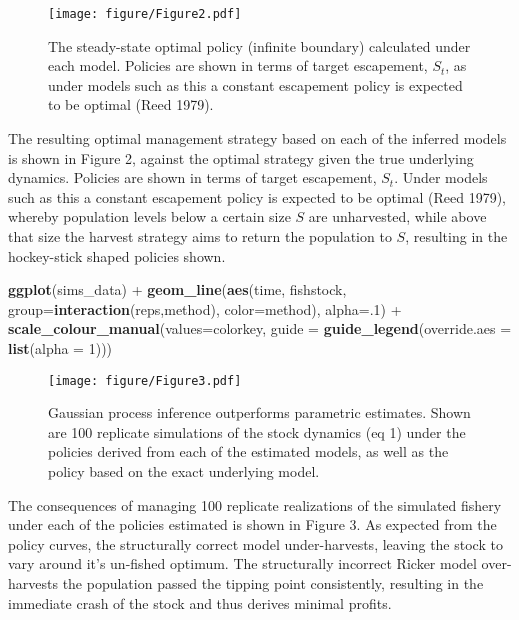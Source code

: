 \documentclass[author-year, review]{elsarticle} %
\makeatletter
\newenvironment{Shaded}{}{}
\newcommand{\KeywordTok}[1]{\textcolor[rgb]{0.00,0.44,0.13}{\textbf{{#1}}}}
\newcommand{\DataTypeTok}[1]{\textcolor[rgb]{0.56,0.13,0.00}{{#1}}}
\newcommand{\DecValTok}[1]{\textcolor[rgb]{0.25,0.63,0.44}{{#1}}}
\newcommand{\NormalTok}[1]{{#1}}
\def\maxwidth{\ifdim\Gin@nat@width>\linewidth\linewidth
\else\Gin@nat@width\fi}
\let\Oldincludegraphics\includegraphics
\renewcommand{\includegraphics}[1]{\Oldincludegraphics[width=\maxwidth]{#1}}
\makeatother
\begin{document}
\begin{figure}[htbp]
\centering
\texttt{[image: figure/Figure2.pdf]}
\caption{The steady-state optimal policy (infinite boundary) calculated
under each model. Policies are shown in terms of target escapement,
$S_t$, as under models such as this a constant escapement policy is
expected to be optimal (Reed 1979).}
\end{figure}

The resulting optimal management strategy based on each of the inferred
models is shown in Figure 2, against the optimal strategy given the true
underlying dynamics. Policies are shown in terms of target escapement,
$S_t$. Under models such as this a constant escapement policy is
expected to be optimal (Reed 1979), whereby population levels below a
certain size $S$ are unharvested, while above that size the harvest
strategy aims to return the population to $S$, resulting in the
hockey-stick shaped policies shown.

\begin{Shaded}
\begin{Highlighting}[]
\KeywordTok{ggplot}\NormalTok{(sims_data) + }
  \KeywordTok{geom_line}\NormalTok{(}\KeywordTok{aes}\NormalTok{(time, fishstock, }\DataTypeTok{group=}\KeywordTok{interaction}\NormalTok{(reps,method), }\DataTypeTok{color=}\NormalTok{method), }\DataTypeTok{alpha=}\NormalTok{.}\DecValTok{1}\NormalTok{) +}
  \KeywordTok{scale_colour_manual}\NormalTok{(}\DataTypeTok{values=}\NormalTok{colorkey, }\DataTypeTok{guide =} \KeywordTok{guide_legend}\NormalTok{(}\DataTypeTok{override.aes =} \KeywordTok{list}\NormalTok{(}\DataTypeTok{alpha =} \DecValTok{1}\NormalTok{)))}
\end{Highlighting}
\end{Shaded}

\begin{figure}[htbp]
\centering
\texttt{[image: figure/Figure3.pdf]}
\caption{Gaussian process inference outperforms parametric estimates.
Shown are 100 replicate simulations of the stock dynamics (eq 1) under
the policies derived from each of the estimated models, as well as the
policy based on the exact underlying model.}
\end{figure}

The consequences of managing 100 replicate realizations of the simulated
fishery under each of the policies estimated is shown in Figure 3. As
expected from the policy curves, the structurally correct model
under-harvests, leaving the stock to vary around it's un-fished optimum.
The structurally incorrect Ricker model over-harvests the population
passed the tipping point consistently, resulting in the immediate crash
of the stock and thus derives minimal profits.
\end{document}
